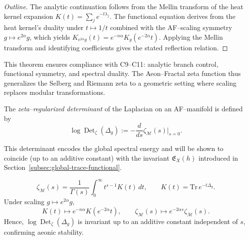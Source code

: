 \begin{proof}[Outline]
The analytic continuation follows from the Mellin transform
of the heat kernel expansion
\(K(t) = \sum_j e^{-t\lambda_j}\).
The functional equation derives from
the heat kernel’s duality under \(t \mapsto 1/t\)
combined with the AF–scaling symmetry \(g \mapsto e^{2\alpha}g\),
which yields \(K_{e^{2\alpha}g}(t) = e^{-n\alpha} K_g(e^{-2\alpha}t)\).
Applying the Mellin transform and identifying coefficients
gives the stated reflection relation.
\end{proof}

\begin{remark}
This theorem ensures compliance with C9–C11:
analytic branch control, functional symmetry, and spectral duality.
The Aeon–Fractal zeta function thus generalizes the Selberg and Riemann zeta
to a geometric setting where scaling replaces modular transformations.
\end{remark}


\begin{definition}
\label{def:zeta-det}
The \emph{zeta–regularized determinant} of the Laplacian
on an AF–manifold is defined by
\begin{equation}
\label{eq:zeta-det}
\log\!\operatorname{Det}_{\zeta}(\Delta_g)
:=
-\frac{d}{ds}\zeta_{\mathcal{M}}(s)\big|_{s=0}.
\end{equation}
\end{definition}

This determinant encodes the global spectral energy
and will be shown to coincide (up to an additive constant)
with the invariant \(\mathfrak{E}_X(h)\)
introduced in Section~\ref{subsec:global-trace-functional}.

\begin{lemma}
\label{lem:heat-kernel}
\[
\zeta_{\mathcal{M}}(s)
=
\frac{1}{\Gamma(s)}
\int_{0}^{\infty}
t^{s-1} K(t) \, dt,
\qquad
K(t)
=
\mathrm{Tr}\, e^{-t\Delta_g}.
\]
Under scaling \(g \mapsto e^{2\alpha} g\),
\[
K(t) \mapsto e^{-n\alpha} K(e^{-2\alpha}t),
\qquad
\zeta_{\mathcal{M}}(s) \mapsto e^{-2\alpha s} \zeta_{\mathcal{M}}(s).
\]
Hence,
\(\log\operatorname{Det}_\zeta(\Delta_g)\)
is invariant up to an additive constant independent of \(s\),
confirming aeonic stability.
\end{lemma}


